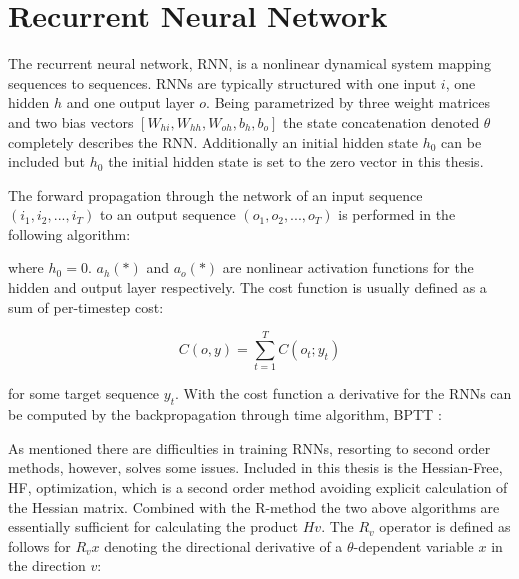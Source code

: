 \section{Recurrent Neural Network}

The recurrent neural network, RNN, is a nonlinear dynamical system mapping sequences to sequences. RNNs are typically structured with one input $i$, one hidden $h$ and one output layer $o$. Being parametrized by three weight matrices and two bias vectors \([W_{hi}, W_{hh}, W_{oh}, b_h, b_o]\) the state concatenation denoted \(\theta\) completely describes the RNN. Additionally an initial hidden state $h_0$ can be included but $h_0$ the initial hidden state is set to the zero vector in this thesis.

The forward propagation through the network of an input sequence \((i_1, i_2, ... , i_T)\) to an output sequence \((o_1, o_2, ..., o_T) \) is performed in the following algorithm:

\begin{algorithmic}[1]
    \EndFor
\end{algorithmic}

where $h_0 = 0$. $a_h(*)$ and $a_o(*)$ are nonlinear activation functions for the hidden and output layer respectively. The cost function is usually defined as a sum of per-timestep cost:

\[C(o, y) = \sum_{t=1}^{T}C(o_t; y_t)\]

for some target sequence $y_t$. With the cost function a derivative for the RNNs can be computed by the backpropagation through time algorithm, BPTT \cite{RNN1}:

\begin{algorithmic}[1]
    \EndFor
    \State {}
\end{algorithmic}

As mentioned there are difficulties in training RNNs, resorting to second order methods, however, solves some issues. Included in this thesis is the Hessian-Free, HF, optimization, which is a second order method avoiding explicit calculation of the Hessian matrix. Combined with the R-method the two above algorithms are essentially sufficient for calculating the product $Hv$. The $R_v$ operator is defined as follows for $R_vx $ denoting the directional derivative of a $\theta$-dependent variable $x$ in the direction $v$:


